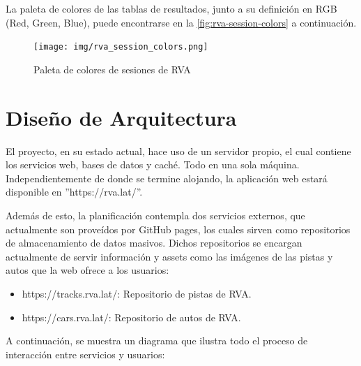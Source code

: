 La paleta de colores de las tablas de resultados, junto a su definición en RGB (Red, Green, Blue), puede encontrarse en la \autoref{fig:rva-session-colors} a continuación.

\begin{figure}[H]
  \begin{center}
    \texttt{[image: img/rva\_session\_colors.png]} 
  \end{center}
  \caption[Paleta de colores de sesiones de RVA]{Paleta de colores de sesiones de RVA}
  \label{fig:rva-session-colors}
\end{figure}

\newpage

\section{Diseño de Arquitectura}
El proyecto, en su estado actual, hace uso de un servidor propio, el cual contiene los servicios web, bases de datos y caché. Todo en una sola máquina. Independientemente de donde se termine alojando, la aplicación web estará disponible en ''https://rva.lat/''.

Además de esto, la planificación contempla dos servicios externos, que actualmente son proveídos por GitHub pages, los cuales sirven como repositorios de almacenamiento de datos masivos. Dichos repositorios se encargan actualmente de servir información y assets como las imágenes de las pistas y autos que la web ofrece a los usuarios:

\begin{itemize}
  \item https://tracks.rva.lat/: Repositorio de pistas de RVA.
  \item https://cars.rva.lat/: Repositorio de autos de RVA.
\end{itemize}

A continuación, se muestra un diagrama que ilustra todo el proceso de interacción entre servicios y usuarios:


